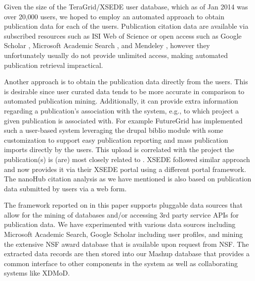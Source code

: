 \documentclass{sig-alternate}
\begin{document}
Given the size of the TeraGrid/XSEDE user database, which as of Jan 2014 was over 20,000 users, we hoped to employ an automated approach to obtain publication data for each of the users. Publication citation data are available via subscribed resources such as ISI Web of Science \cite{www-isiwos} or open access such as Google Scholar \cite{www-googlescholar}, Microsoft Academic Search \cite{www-msas}, and Mendeley \cite{www-mendeley}, however they unfortunately usually do not provide unlimited access, making automated publication retrieval impractical. 
 
Another approach is to obtain the publication data directly from the users. This is desirable since user curated data tends to be more accurate in comparison to automated publication mining. Additionally, it can provide extra information regarding a publication's association with the system, e.g., to which project a given publication is associated with. 
For example FutureGrid has implemented such a user-based system leveraging the drupal biblio module \cite{www-drupal-bib} with some customization to support easy publication reporting and mass publication imports directly by the users. This upload is correlated with the project the publication(s) is (are) most closely related to \cite{www-fgbiblio}. XSEDE followed similar approach and now provides it via their XSEDE portal \cite{www-xdportalpub} using a different portal framework. The nanoHub citation analysis \cite{www-nanohubcite} as we have mentioned is also based on publication data submitted by users via a web form. 
 
The framework reported on in this paper supports pluggable data sources that allow for the mining of databases and/or accessing 3rd party service APIs for publication data. We have experimented with various data sources including Microsoft Academic Search, Google Scholar including user profiles, and mining the extensive NSF award database that is available upon request from NSF. The extracted data records are then stored into our Mashup database that provides a common interface to other components in the system as well as collaborating systems like XDMoD.
 
\end{document}
